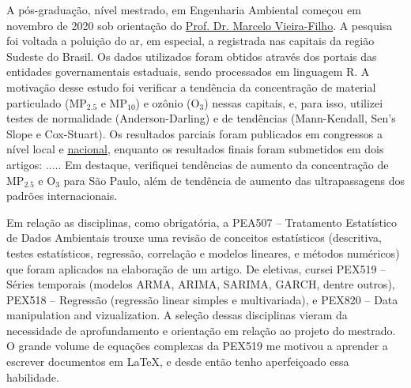 \documentclass[12pt,a4paper]{article}
\begin{document}
	A pós-graduação, nível mestrado, em Engenharia Ambiental começou em novembro de 2020 sob orientação do \href{http://lattes.cnpq.br/5059318976988668}{Prof. Dr. Marcelo Vieira-Filho}. A pesquisa foi voltada a poluição do ar, em especial, a registrada nas capitais da região Sudeste do Brasil. Os dados utilizados foram obtidos através dos portais das entidades governamentais estaduais, sendo processados em linguagem R. A motivação desse estudo foi verificar a tendência da concentração de material particulado (MP$_{2.5}$ e MP$_{10}$) e ozônio (O$_3$) nessas capitais, e, para isso, utilizei testes de normalidade (Anderson-Darling) e de tendências (Mann-Kendall, Sen’s Slope e Cox-Stuart). Os resultados parciais foram publicados em congressos a nível local e \href{http://www.meioambientepocos.com.br/ANAIS2022/76%20-%20244016_crescimento-da-concentrao-de-materiais-particulados-e-oznio-em-capitais-brasileiras.pdf}{nacional}, enquanto os resultados finais foram submetidos em dois artigos: ..... Em destaque, verifiquei tendências de aumento da concentração de MP$_{2.5}$ e O$_3$ para São Paulo, além de tendência de aumento das ultrapassagens dos padrões internacionais.
	
	Em relação as disciplinas, como obrigatória, a PEA507 – Tratamento Estatístico de Dados Ambientais trouxe uma revisão de conceitos estatísticos (descritiva, testes estatísticos, regressão, correlação e modelos lineares, e métodos numéricos) que foram aplicados na elaboração de um artigo. De eletivas, cursei PEX519 – Séries temporais (modelos ARMA, ARIMA, SARIMA, GARCH, dentre outros), PEX518 – Regressão (regressão linear simples e multivariada), e PEX820 – Data manipulation and vizualization. A seleção dessas disciplinas vieram da necessidade de aprofundamento e orientação em relação ao projeto do mestrado. O grande volume de equações complexas da PEX519 me motivou a aprender a escrever documentos em \LaTeX, e desde então tenho aperfeiçoado essa habilidade.
	
	
	\label{LastPage}
\end{document}
